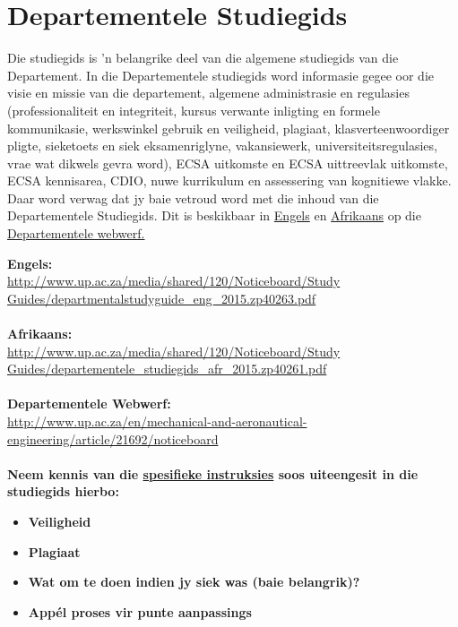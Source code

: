 \section{Departementele Studiegids}\label{sec:department}
    Die studiegids is 'n belangrike deel van die algemene studiegids
    van die Departement. In die Departementele studiegids word
    informasie gegee oor die visie en missie van die departement,
    algemene administrasie en regulasies (professionaliteit en
    integriteit, kursus verwante inligting en formele kommunikasie,
    werkswinkel gebruik en veiligheid, plagiaat, klasverteenwoordiger
    pligte, sieketoets en siek eksamenriglyne, vakansiewerk,
    universiteitsregulasies, vrae wat dikwels gevra word), ECSA
    uitkomste en ECSA uittreevlak uitkomste, ECSA kennisarea, CDIO,
    nuwe kurrikulum en assessering van kognitiewe vlakke.  Daar word
    verwag dat jy baie vetroud word met die inhoud van die
    Departementele Studiegids.  Dit is beskikbaar in
    \href{http://www.up.ac.za/media/shared/120/Noticeboard/Study Guides/departmentalstudyguide_eng_2015.zp40263.pdf}{Engels}
    en
    \href{http://www.up.ac.za/media/shared/120/Noticeboard/Study Guides/departementele_studiegids_afr_2015.zp40261.pdf}{Afrikaans}
    op die
    \href{http://www.up.ac.za/en/mechanical-and-aeronautical-engineering/article/21692/noticeboard}{Departementele webwerf.}

    \noindent
    \textbf{Engels:} \\
    \url{http://www.up.ac.za/media/shared/120/Noticeboard/Study Guides/departmentalstudyguide_eng_2015.zp40263.pdf} \\~\\
    \textbf{Afrikaans:} \\
    \url{http://www.up.ac.za/media/shared/120/Noticeboard/Study Guides/departementele_studiegids_afr_2015.zp40261.pdf} \\~\\
    \textbf{Departementele Webwerf:} \\
    \url{http://www.up.ac.za/en/mechanical-and-aeronautical-engineering/article/21692/noticeboard} \\~\\

    \noindent
    \textbf{Neem kennis van die \uline{spesifieke instruksies} soos uiteengesit
    in die studiegids hierbo:}
    \begin{itemize}
        \item \textbf{Veiligheid}
        \item \textbf{Plagiaat}
        \item \textbf{Wat om te doen indien jy siek was (baie belangrik)?}
        \item \textbf{App\'el proses vir punte aanpassings}
    \end{itemize}
